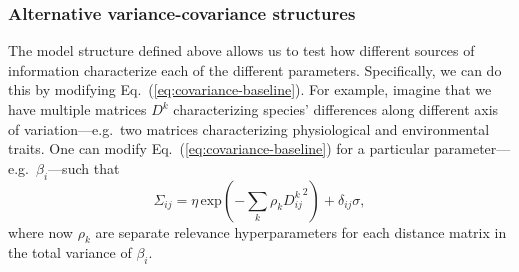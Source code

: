 \documentclass[11pt, a4paper]{article}
\begin{document}

%

\subsubsection*{Alternative variance-covariance structures}
The model structure defined above allows us to test how different sources of information characterize each of the different parameters. Specifically, we can do this by modifying Eq.~(\ref{eq:covariance-baseline}). For example, imagine that we have multiple matrices $D^k$ characterizing species' differences along different axis of variation---e.g.~two matrices characterizing physiological and environmental traits. One can modify Eq.~(\ref{eq:covariance-baseline}) for a particular parameter---e.g.~$\beta_{i}$---such that
\begin{equation} 
\Sigma_{ij} = \eta\,\text{exp}\left(-\sum_k\rho_{k} {D^{k}_{ij}}^2\right) + \delta_{ij} \sigma ,
\label{eq:covariance-complex}
\end{equation}
where now $\rho_{k}$ are separate relevance hyperparameters for each distance matrix in the total variance of $\beta_i$.
\end{document}

